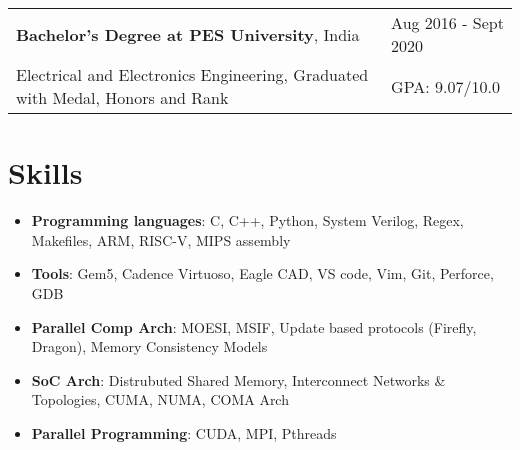\documentclass[a4paper,10pt]{article}
\begin{document}
\begin{tabularx}{\linewidth}{ @{}l X@{} }
    \textbf{Bachelor's Degree at PES University}, India & \hfill {\small Aug 2016 - Sept 2020} \\[2.75pt]
    {\small Electrical and Electronics Engineering, Graduated with Medal, Honors and Rank} & \hfill {\small GPA: 9.07/10.0}
\end{tabularx}

\vspace{-0.1cm}
\section{Skills}

\begin{minipage}[t]{\linewidth}
    \begin{itemize}[nosep, leftmargin=2em, itemsep=3pt]
        \item \textbf{Programming languages}: C, C++, Python, System Verilog, Regex, Makefiles, ARM, RISC-V, MIPS assembly
        \item \textbf{Tools}: Gem5, Cadence Virtuoso, Eagle CAD, VS code, Vim, Git, Perforce, GDB
        \item \textbf{Parallel Comp Arch}: MOESI, MSIF, Update based protocols (Firefly, Dragon), Memory Consistency Models
        \item \textbf{SoC Arch}: Distrubuted Shared Memory, Interconnect Networks \& Topologies, CUMA, NUMA, COMA Arch
        \item \textbf{Parallel Programming}: CUDA, MPI, Pthreads
        
    \end{itemize}
\end{minipage} 

\vspace{-0.1cm}
\end{document}
